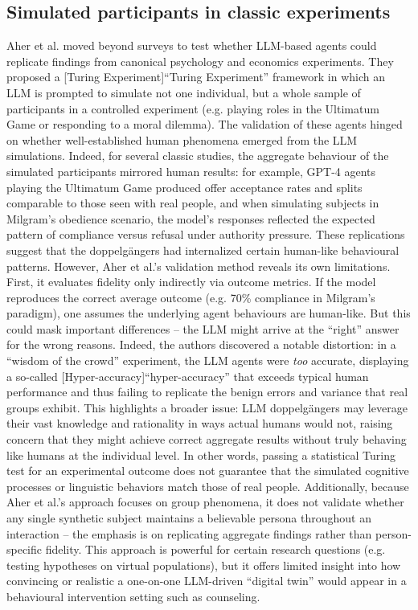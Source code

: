 \subsection{Simulated participants in classic experiments}
Aher et al. \cite{Aher2023} moved beyond surveys to test whether LLM-based agents could replicate findings from canonical psychology and economics experiments. They proposed a [Turing Experiment]“Turing Experiment” framework in which an LLM is prompted to simulate not one individual, but a whole sample of participants in a controlled experiment (e.g. playing roles in the Ultimatum Game or responding to a moral dilemma). The validation of these agents hinged on whether well-established human phenomena emerged from the LLM simulations. Indeed, for several classic studies, the aggregate behaviour of the simulated participants mirrored human results: for example, GPT-4 agents playing the Ultimatum Game produced offer acceptance rates and splits comparable to those seen with real people, and when simulating subjects in Milgram’s obedience scenario, the model’s responses reflected the expected pattern of compliance versus refusal under authority pressure. These replications suggest that the doppelgängers had internalized certain human-like behavioural patterns. However, Aher et al.’s validation method reveals its own limitations. First, it evaluates fidelity only indirectly via outcome metrics. If the model reproduces the correct average outcome (e.g. 70\% compliance in Milgram’s paradigm), one assumes the underlying agent behaviours are human-like. But this could mask important differences – the LLM might arrive at the “right” answer for the wrong reasons. Indeed, the authors discovered a notable distortion: in a “wisdom of the crowd” experiment, the LLM agents were \emph{too} accurate, displaying a so-called [Hyper-accuracy]“hyper-accuracy” that exceeds typical human performance and thus failing to replicate the benign errors and variance that real groups exhibit. This highlights a broader issue: LLM doppelgängers may leverage their vast knowledge and rationality in ways actual humans would not, raising concern that they might achieve correct aggregate results without truly behaving like humans at the individual level. In other words, passing a statistical Turing test for an experimental outcome does not guarantee that the simulated cognitive processes or linguistic behaviors match those of real people. Additionally, because Aher et al.’s approach focuses on group phenomena, it does not validate whether any single synthetic subject maintains a believable persona throughout an interaction – the emphasis is on replicating aggregate findings rather than person-specific fidelity. This approach is powerful for certain research questions (e.g. testing hypotheses on virtual populations), but it offers limited insight into how convincing or realistic a one-on-one LLM-driven “digital twin” would appear in a behavioural intervention setting such as counseling.

